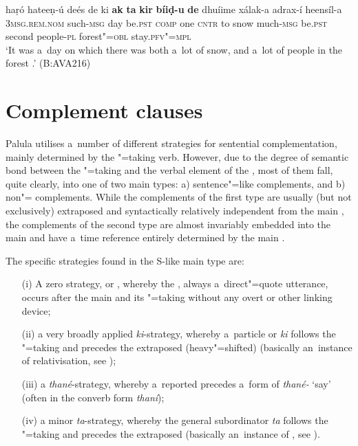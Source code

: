 \begin{exe}
\ex
\label{ex:13-126}
\gll haṛó hateeṇ-ú deés de ki \textbf{ak} \textbf{ta} \textbf{kir} \textbf{bíiḍ-u} \textbf{de} dhuíime xálak-a  adrax-í heensíl-a \\
\textsc{3msg.rem.nom} such-\textsc{msg}  day be.\textsc{pst} \textsc{comp} one \textsc{cntr} to snow much-\textsc{msg} be.\textsc{pst} second people-\textsc{pl}  forest"=\textsc{obl} stay.\textsc{pfv"=mpl} \\
\glt `It was a~day on which there was both a~lot of snow, and a~lot of people in the forest .' (B:AVA216)
\end{exe}

\section{Complement clauses}
\label{sec:13-5}

Palula utilises a~number of different strategies for sentential complementation, mainly determined by the "=taking verb. However, due to the degree of semantic bond between the "=taking  and the verbal element of the  \citep[39-40]{givon2001b}, most of them fall, quite clearly, into one of two main types: a) sentence"=like complements, and b) non"= complements. While the complements of the first type are usually (but not exclusively) extraposed and syntactically relatively independent from the main , the complements of the second type are almost invariably embedded into the main  and have a~time reference entirely determined by the main .

The specific strategies found in the S-like main type are:

\begin{enumerate}
\item[(i)] A zero strategy, or , whereby the , always a~direct"=quote utterance, occurs after the main  and its "=taking  without any overt  or other linking device;
\item[(ii)] a very broadly applied \textit{ki}-strategy, whereby a~particle or  \textit{ki} follows the "=taking  and precedes the extraposed (heavy"=shifted)   (basically an~instance of relativisation, see );
\item[(iii)] a \textit{thané}-strategy, whereby a~reported   precedes a~form of \textit{thané-} `say' (often in the converb form \textit{thaní});
\item[(iv)] a minor \textit{ta}-strategy, whereby the general subordinator \textit{ta} follows the "=taking  and precedes the extraposed   (basically an~instance of , see ).
\end{enumerate}

